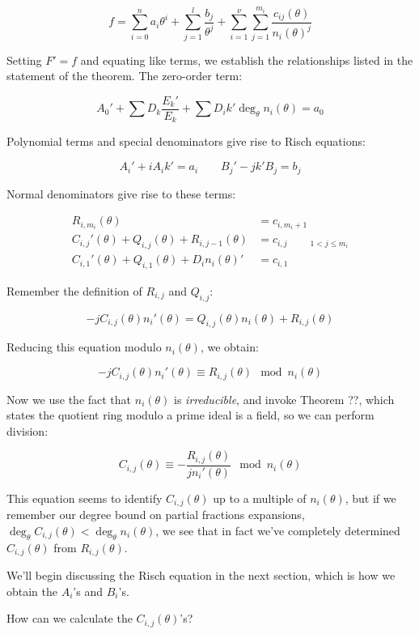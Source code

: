 $$f = \sum_{i=0}^n a_i \theta^i + \sum_{j=1}^{l} \frac{b_{j}}{\theta^j}
+ \sum_{i=1}^\nu \sum_{j=1}^{m_i} \frac{c_{ij}(\theta)}{n_i(\theta)^j}$$

Setting $F' = f$ and equating like terms, we establish the
relationships listed in the statement of the theorem.  The zero-order term:

$$A_0' + \sum D_k \frac{E_k'}{E_k} + \sum D_i k' \deg_\theta n_i(\theta) = a_0$$

Polynomial terms
and special denominators give rise to Risch equations:

$$A_i' + i A_i k' = a_i  \qquad  B_{j}' - j k' B_{j} = b_j$$

Normal denominators give rise to these terms:

\begin{align*}
R_{i,m_i}(\theta) & = c_{i,m_i+1} \\
C_{i,j}'(\theta) + Q_{i,j}(\theta) + R_{i,j-1}(\theta) & = c_{i,j} \qquad {}_{1<j\le m_i}\\
C_{i,1}'(\theta) + Q_{i,1}(\theta) + D_i n_i(\theta)' & = c_{i,1}
\end{align*}

Remember the definition of
$R_{i,j}$ and $Q_{i,j}$:

$$-jC_{i,j}(\theta)n_i'(\theta) = Q_{i,j}(\theta) n_i(\theta) + R_{i,j}(\theta)$$

Reducing this equation modulo $n_i(\theta)$, we obtain:

$$-jC_{i,j}(\theta)n_i'(\theta) \equiv R_{i,j}(\theta) \mod n_i(\theta)$$

Now we use the fact that $n_i(\theta)$ is {\it irreducible},
and invoke Theorem ??, which states the quotient ring
modulo a prime ideal is a field, so we can perform division:

$$C_{i,j}(\theta) \equiv - \frac{R_{i,j}(\theta)}{jn_i'(\theta)} \mod n_i(\theta)$$

This equation seems to identify $C_{i,j}(\theta)$ up to a multiple of $n_i(\theta)$,
but if we remember our degree bound on partial fractions expansions,
$\deg_\theta C_{i,j}(\theta) < \deg_\theta n_i(\theta)$, we see
that in fact we've completely determined $C_{i,j}(\theta)$ from
$R_{i,j}(\theta)$.

\endtheorem

We'll begin discussing the Risch equation in the next section, which
is how we obtain the $A_i$'s and $B_i$'s.

How can we calculate the $C_{i,j}(\theta)$'s?

